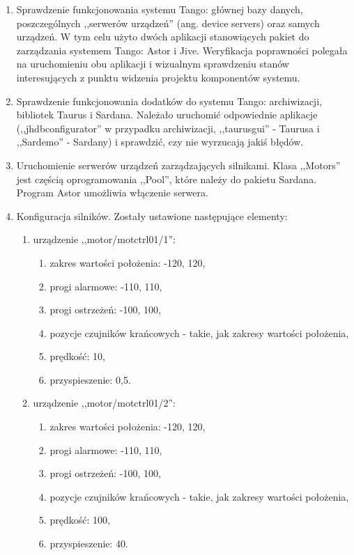 \begin{enumerate}
	\item Sprawdzenie funkcjonowania systemu Tango: głównej bazy danych, poszczególnych ,,serwerów urządzeń'' (ang. device servers) oraz samych urządzeń. W tym celu użyto dwóch aplikacji stanowiących pakiet do zarządzania systemem Tango: Astor i Jive. Weryfikacja poprawności polegała na uruchomieniu obu aplikacji i wizualnym sprawdzeniu stanów interesujących z punktu widzenia projektu komponentów systemu.
	\item Sprawdzenie funkcjonowania dodatków do systemu Tango: archiwizacji, bibliotek Taurus i Sardana. Należało uruchomić odpowiednie aplikacje (,,jhdbconfigurator'' w przypadku archiwizacji, ,,taurusgui'' - Taurusa i ,,Sardemo'' - Sardany) i sprawdzić, czy nie wyrzucają jakiś błędów.
	\item Uruchomienie serwerów urządzeń zarządzających silnikami. Klasa ,,Motors'' jest częścią oprogramowania ,,Pool'', które należy do pakietu Sardana. Program Astor umożliwia włączenie serwera.
	\item Konfiguracja silników. Zostały ustawione następujące elementy:
	\begin{enumerate}
		\item urządzenie ,,motor/motctrl01/1'':
		\begin{enumerate}
			\item zakres wartości położenia: -120, 120,
			\item progi alarmowe: -110, 110,
			\item progi ostrzeżeń: -100, 100,
			\item pozycje czujników krańcowych - takie, jak zakresy wartości położenia,
			\item prędkość: 10,
			\item przyspieszenie: 0,5.
		\end{enumerate}
		\item urządzenie ,,motor/motctrl01/2'':
		\begin{enumerate}
			\item zakres wartości położenia: -120, 120,
			\item progi alarmowe: -110, 110,
			\item progi ostrzeżeń: -100, 100,
			\item pozycje czujników krańcowych - takie, jak zakresy wartości położenia,
			\item prędkość: 100,
			\item przyspieszenie: 40.
		\end{enumerate}

\end{enumerate}
\end{enumerate}
